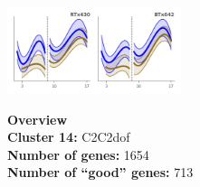 \begin{multicols}{2}
\includegraphics[width=2in]{figures/clusters/root_Preflowering_13.png}
\columnbreak

\noindent \textbf{Overview}\\\textbf{Cluster 14:} C2C2dof \\
\textbf{Number of genes:} 1654 \\
\textbf{Number of ``good'' genes:} 713 \\
\end{multicols}

